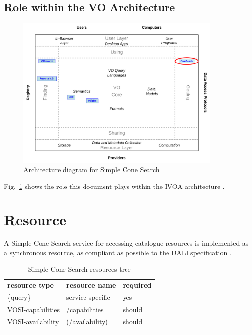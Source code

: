 \documentclass[11pt,a4paper]{ivoa}
\begin{document}
\subsection{Role within the VO Architecture}

\begin{figure}
\centering


\includegraphics[width=0.9\textwidth]{role_diagram.pdf}
\caption{Architecture diagram for Simple Cone Search}
\label{fig:archdiag} 
\end{figure}

Fig.~\ref{fig:archdiag} shows the role this document plays within the
IVOA architecture \citep{note:VOARCH}.

\section{Resource}
\label{sec:resif}

A Simple Cone Search service for accessing catalogue resources is
implemented as a synchronous resource, as compliant as possible to the
DALI specification \citep{std:DALI}.

\begin{table}[th] 
\begin{center}
\begin{tabular}{p{}p{}p{}}
\sptablerule \textbf{resource type}&\textbf{resource name}&\textbf{required}\\ 
\sptablerule \{query\} & service specific & yes\\ VOSI-capabilities & /capabilities & should\\ VOSI-availability & (/availability) & should\\ 
\sptablerule 
\label{table:resources} 
\end{tabular} 
\caption{Simple Cone Search resources tree} 
\end{center}
\end{table}
\end{document}
